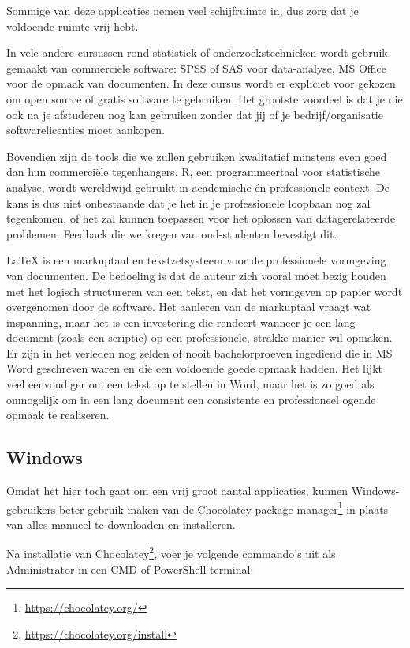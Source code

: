 Sommige van deze applicaties nemen veel schijfruimte in, dus zorg dat je voldoende ruimte vrij hebt.

In vele andere cursussen rond statistiek of onderzoekstechnieken wordt gebruik gemaakt van commerci\"ele software: SPSS of SAS voor data-analyse, MS Office voor de opmaak van documenten. In deze cursus wordt er expliciet voor gekozen om open source of gratis software te gebruiken. Het grootste voordeel is dat je die ook na je afstuderen nog kan gebruiken zonder dat jij of je bedrijf/organisatie softwarelicenties moet aankopen.

Bovendien zijn de tools die we zullen gebruiken kwalitatief minstens even goed dan hun commerci\"ele tegenhangers. R, een programmeertaal voor statistische analyse, wordt wereldwijd gebruikt in academische én professionele context. De kans is dus niet onbestaande dat je het in je professionele loopbaan nog zal tegenkomen, of het zal kunnen toepassen voor het oplossen van datagerelateerde problemen. Feedback die we kregen van oud-studenten bevestigt dit.

\LaTeX{} is een markuptaal en tekstzetsysteem voor de professionele vormgeving van documenten. De bedoeling is dat de auteur zich vooral moet bezig houden met het logisch structureren van een tekst, en dat het vormgeven op papier wordt overgenomen door de software. Het aanleren van de markuptaal vraagt wat inspanning, maar het is een investering die rendeert wanneer je een lang document (zoals een scriptie) op een professionele, strakke manier wil opmaken. Er zijn in het verleden nog zelden of nooit bachelorproeven ingediend die in MS Word geschreven waren en die een voldoende goede opmaak hadden. Het lijkt veel eenvoudiger om een tekst op te stellen in Word, maar het is zo goed als onmogelijk om in een lang document een consistente en professioneel ogende opmaak te realiseren.

\subsection{Windows}

Omdat het hier toch gaat om een vrij groot aantal applicaties, kunnen Windows-gebruikers beter gebruik maken van de Chocolatey package manager\footnote{\url{https://chocolatey.org/}} in plaats van alles manueel te downloaden en installeren.

Na installatie van Chocolatey\footnote{\url{https://chocolatey.org/install}}, voer je volgende commando's uit als Administrator in een CMD of PowerShell terminal:

